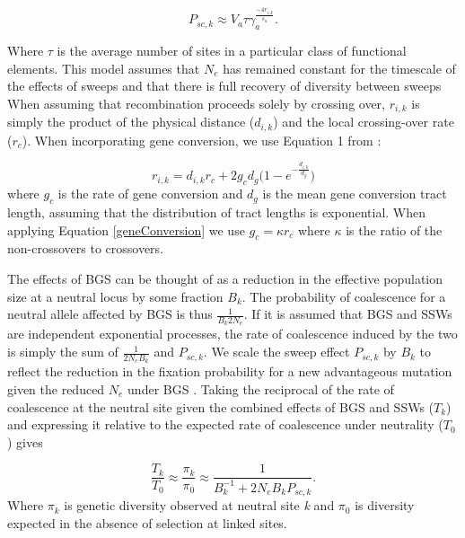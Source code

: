 \begin{equation}
\label{singleClass}
P_{sc,k} \approx V_a \tau\gamma_a^{\frac{-4r_{i,k}}{s_a}}.
\end{equation}

\noindent
Where $\tau$ is the average number of sites in a particular class of functional elements. This model assumes that $N_e$ has remained constant for the timescale of the effects of sweeps and that there is full recovery of diversity between sweeps When assuming that recombination proceeds solely by crossing over, $r_{i,k}$ is simply the product of the physical distance ($d_{i,k}$) and the local crossing-over rate ($r_c$). When incorporating gene conversion, we use Equation 1 from \cite{RN379}:
 
\begin{equation}
\label{geneConversion}
r_{i,k} = d_{i,k} r_c + 2 g_c d_g \Bigg( 1 - e ^{-\frac{d_{i,k}}{d_g}} \Bigg)
\end{equation} 
\noindent 
where $g_c$ is the rate of gene conversion and $d_g$ is the mean gene conversion tract length, assuming that the distribution of tract lengths is exponential. When applying Equation \ref{geneConversion} we use $g_c = \kappa r_c$ where $\kappa$ is the ratio of the non-crossovers to crossovers.
	

	The effects of BGS can be thought of as a reduction in the effective population size at a neutral locus by some fraction $B_k$. The probability of coalescence for a neutral allele affected by BGS is thus $\frac{1}{B_k 2N_e}$. If it is assumed that BGS and SSWs are independent exponential processes, the rate of coalescence induced by the two is simply the sum of $\frac{1}{2N_e B_k}$ and $P_{sc,k}$. We scale the sweep effect $P_{sc,k}$ by $B_k$ to reflect the reduction in the fixation probability for a new advantageous mutation given the reduced $N_e$ under BGS \citep{RN349}. Taking the reciprocal of the rate of coalescence at the neutral site given the combined effects of BGS and SSWs ($T_k$) and expressing it relative to the expected rate of coalescence under neutrality ($T_0$) gives

\begin{equation}
\label{jointApprox}
\frac{T_k}{T_0} \approx \frac{\pi_{k}}{\pi_{0}} \approx  \frac{1}{B_{k}^{-1}  + 2N_eB_{k}P_{sc,k}}.
\end{equation}
\noindent
	Where $\pi_k$ is genetic diversity observed at neutral site \textit{k} and $\pi_0$ is diversity expected in the absence of selection at linked sites. 
	
